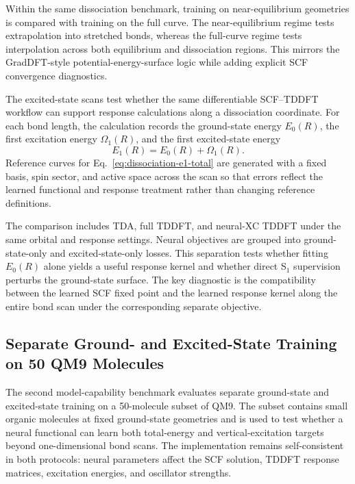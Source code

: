 Within the same dissociation benchmark, training on near-equilibrium
geometries is compared with training on the full curve. The
near-equilibrium regime tests extrapolation into stretched bonds,
whereas the full-curve regime tests interpolation across both
equilibrium and dissociation regions. This mirrors the GradDFT-style
potential-energy-surface logic while adding explicit SCF convergence
diagnostics.

The excited-state scans test whether the same differentiable
SCF--TDDFT workflow can support response calculations along a
dissociation coordinate. For each bond length,
the calculation records the ground-state energy $E_0(R)$, the first
excitation energy $\Omega_1(R)$, and the first excited-state energy
\begin{equation}
  E_1(R)=E_0(R)+\Omega_1(R).
  \label{eq:dissociation-e1-total}
\end{equation}
Reference curves for Eq.~\eqref{eq:dissociation-e1-total} are
generated with a fixed basis, spin sector, and active space across
the scan so that errors reflect the learned functional and response
treatment rather than changing reference definitions.

The comparison includes TDA, full TDDFT, and neural-XC TDDFT under
the same orbital and response settings. Neural objectives are grouped
into ground-state-only and excited-state-only losses. This separation
tests whether fitting $E_0(R)$ alone yields a useful response kernel
and whether direct S$_1$ supervision perturbs the ground-state
surface. The key diagnostic is the compatibility between the learned
SCF fixed point and the learned response kernel along the entire bond
scan under the corresponding separate objective.

\clearpage

\subsection{Separate Ground- and Excited-State Training on 50 QM9 Molecules}
\label{sec:eval-qm9-50}

The second model-capability benchmark evaluates separate ground-state
and excited-state training on a 50-molecule subset of QM9.\cite{QM9}
The subset contains small organic molecules at fixed ground-state
geometries and is used to test whether a neural functional can learn
both total-energy and vertical-excitation targets beyond
one-dimensional bond scans. The implementation remains
self-consistent in both protocols: neural parameters affect the SCF
solution, TDDFT response matrices, excitation energies, and oscillator
strengths.

